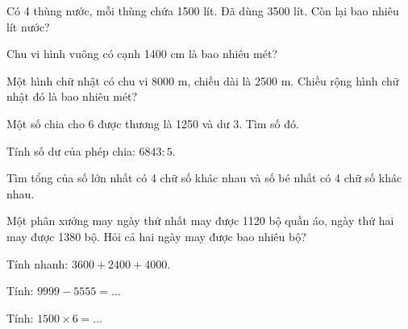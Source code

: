 \begin{ex}
Có 4 thùng nước, mỗi thùng chứa 1500 lít. Đã dùng 3500 lít. Còn lại bao nhiêu lít nước?
\end{ex}

\begin{ex}
Chu vi hình vuông có cạnh 1400 cm là bao nhiêu mét?
\end{ex}

\begin{ex}
Một hình chữ nhật có chu vi 8000 m, chiều dài là 2500 m. Chiều rộng hình chữ nhật đó là bao nhiêu mét?
\end{ex}

\begin{ex}
Một số chia cho 6 được thương là 1250 và dư 3. Tìm số đó.
\end{ex}

\begin{ex}
Tính số dư của phép chia: $6843 : 5$.
\end{ex}

\begin{ex}
Tìm tổng của số lớn nhất có 4 chữ số khác nhau và số bé nhất có 4 chữ số khác nhau.
\end{ex}

\begin{ex}
Một phân xưởng may ngày thứ nhất may được 1120 bộ quần áo, ngày thứ hai may được 1380 bộ. Hỏi cả hai ngày may được bao nhiêu bộ?
\end{ex}

\begin{ex}
Tính nhanh: $3600 + 2400 + 4000$.
\end{ex}

\begin{ex}
Tính: $9999 - 5555 = \dots$
\end{ex}

\begin{ex}
Tính: $1500 \times 6 = \dots$
\end{ex}

